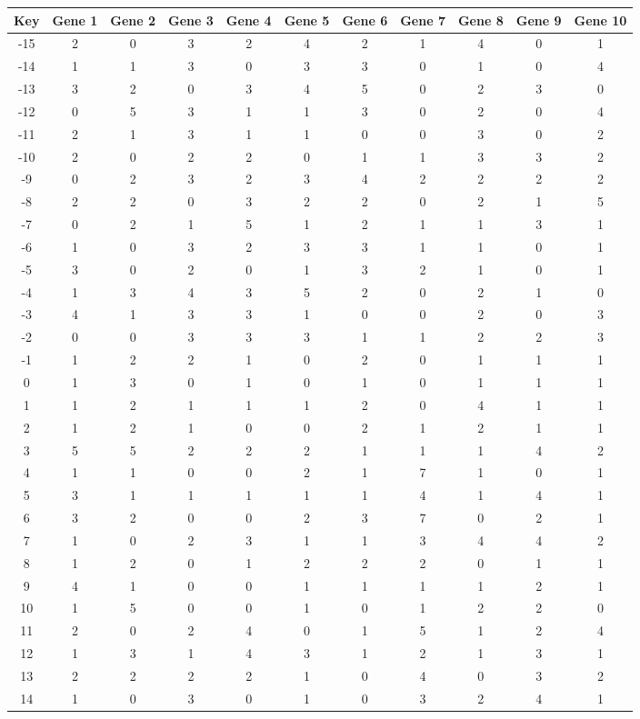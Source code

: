 \begin{tabular}{|c|c|c|c|c|c|c|c|c|c|c|}
\hline
Key & Gene 1 & Gene 2 & Gene 3 & Gene 4 & Gene 5 & Gene 6 & Gene 7 & Gene 8 & Gene 9 & Gene 10 \\
\hline
-15 & 2 & 0 & 3 & 2 & 4 & 2 & 1 & 4 & 0 & 1 \\
-14 & 1 & 1 & 3 & 0 & 3 & 3 & 0 & 1 & 0 & 4 \\
-13 & 3 & 2 & 0 & 3 & 4 & 5 & 0 & 2 & 3 & 0 \\
-12 & 0 & 5 & 3 & 1 & 1 & 3 & 0 & 2 & 0 & 4 \\
-11 & 2 & 1 & 3 & 1 & 1 & 0 & 0 & 3 & 0 & 2 \\
-10 & 2 & 0 & 2 & 2 & 0 & 1 & 1 & 3 & 3 & 2 \\
-9 & 0 & 2 & 3 & 2 & 3 & 4 & 2 & 2 & 2 & 2 \\
-8 & 2 & 2 & 0 & 3 & 2 & 2 & 0 & 2 & 1 & 5 \\
-7 & 0 & 2 & 1 & 5 & 1 & 2 & 1 & 1 & 3 & 1 \\
-6 & 1 & 0 & 3 & 2 & 3 & 3 & 1 & 1 & 0 & 1 \\
-5 & 3 & 0 & 2 & 0 & 1 & 3 & 2 & 1 & 0 & 1 \\
-4 & 1 & 3 & 4 & 3 & 5 & 2 & 0 & 2 & 1 & 0 \\
-3 & 4 & 1 & 3 & 3 & 1 & 0 & 0 & 2 & 0 & 3 \\
-2 & 0 & 0 & 3 & 3 & 3 & 1 & 1 & 2 & 2 & 3 \\
-1 & 1 & 2 & 2 & 1 & 0 & 2 & 0 & 1 & 1 & 1 \\
0 & 1 & 3 & 0 & 1 & 0 & 1 & 0 & 1 & 1 & 1 \\
1 & 1 & 2 & 1 & 1 & 1 & 2 & 0 & 4 & 1 & 1 \\
2 & 1 & 2 & 1 & 0 & 0 & 2 & 1 & 2 & 1 & 1 \\
3 & 5 & 5 & 2 & 2 & 2 & 1 & 1 & 1 & 4 & 2 \\
4 & 1 & 1 & 0 & 0 & 2 & 1 & 7 & 1 & 0 & 1 \\
5 & 3 & 1 & 1 & 1 & 1 & 1 & 4 & 1 & 4 & 1 \\
6 & 3 & 2 & 0 & 0 & 2 & 3 & 7 & 0 & 2 & 1 \\
7 & 1 & 0 & 2 & 3 & 1 & 1 & 3 & 4 & 4 & 2 \\
8 & 1 & 2 & 0 & 1 & 2 & 2 & 2 & 0 & 1 & 1 \\
9 & 4 & 1 & 0 & 0 & 1 & 1 & 1 & 1 & 2 & 1 \\
10 & 1 & 5 & 0 & 0 & 1 & 0 & 1 & 2 & 2 & 0 \\
11 & 2 & 0 & 2 & 4 & 0 & 1 & 5 & 1 & 2 & 4 \\
12 & 1 & 3 & 1 & 4 & 3 & 1 & 2 & 1 & 3 & 1 \\
13 & 2 & 2 & 2 & 2 & 1 & 0 & 4 & 0 & 3 & 2 \\
14 & 1 & 0 & 3 & 0 & 1 & 0 & 3 & 2 & 4 & 1 \\
\hline
\end{tabular}